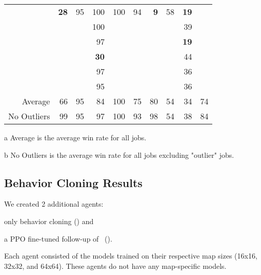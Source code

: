 \documentclass[conference]{IEEEtran}
\begin{document}
\begin{table}[t]
\begin{threeparttable}
\begin{tabular}{r|rrrrrrrr|l}
    & \textbf{28} & 95 & 100 & 100 & 94 & \textbf{9} & 58 & \textbf{19} &  \\
    & \multicolumn{1}{l}{} & \multicolumn{1}{l}{} & 100 & \multicolumn{1}{l}{} & \multicolumn{1}{l}{} & \multicolumn{1}{l}{} & \multicolumn{1}{l}{} & 39 &  \\
    & \multicolumn{1}{l}{} & \multicolumn{1}{l}{} & 97 & \multicolumn{1}{l}{} & \multicolumn{1}{l}{} & \multicolumn{1}{l}{} & \multicolumn{1}{l}{} & \textbf{19} &  \\
    & \multicolumn{1}{l}{} & \multicolumn{1}{l}{} & \textbf{30} & \multicolumn{1}{l}{} & \multicolumn{1}{l}{} & \multicolumn{1}{l}{} & \multicolumn{1}{l}{} & 44 &  \\
    & \multicolumn{1}{l}{} & \multicolumn{1}{l}{} & 97 & \multicolumn{1}{l}{} & \multicolumn{1}{l}{} & \multicolumn{1}{l}{} & \multicolumn{1}{l}{} & 36 &  \\
    & \multicolumn{1}{l}{} & \multicolumn{1}{l}{} & 95 & \multicolumn{1}{l}{} &
    \multicolumn{1}{l}{} & \multicolumn{1}{l}{} & \multicolumn{1}{l}{} & 36 &  \\
    \hline
   Average\tnote{a} & 66 & 95 & 84 & 100 & 75 & 80 & 54 & 34 & \multicolumn{1}{r}{74} \\
   No Outliers\tnote{b} & 99 & 95 & 97 & 100 & 93 & 98 & 54 & 38 & \multicolumn{1}{r}{84} \\
    \end{tabular}
    \begin{tablenotes}
        \item[a] Average is the average win rate for all jobs.
        \item[b] No Outliers is the average win rate for all jobs excluding "outlier" jobs.
    \end{tablenotes}
\end{threeparttable}
\end{table}

\subsection{Behavior Cloning Results}
\label{sec:behavior-cloning-results}
We created 2 additional agents:
\begin{inparaenum}[(1)]
    \item only behavior cloning (\bcAgent) and
    \item a PPO fine-tuned follow-up of \bcAgent\ (\bcPPOAgent).
\end{inparaenum}
Each agent consisted of the models trained on their
respective map sizes (16x16, 32x32, and 64x64). These agents do not have any
map-specific models.
\end{document}
